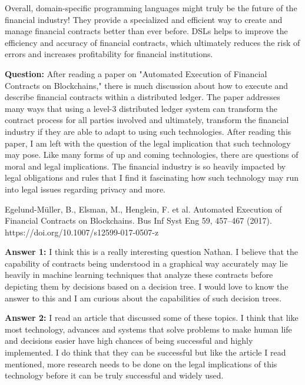 \documentclass{article}
\theoremstyle{theorem}
\theoremstyle{definition}
\theoremstyle{remark}
\begin{document}
Overall, domain-specific programming languages might truly be the future of the financial industry! They provide a specialized and efficient way to create and manage financial contracts better than ever before. DSLs helps to improve the efficiency and accuracy of financial contracts, which ultimately reduces the risk of errors and increases profitability for financial institutions.


\medskip\noindent
\textbf{Question:} After reading a paper on "Automated Execution of Financial Contracts on Blockchains," there is much discussion about how to execute and describe financial contracts within a distributed ledger.  The paper addresses many ways that using a level-3 distributed ledger system can transform the contract process for all parties involved and ultimately, transform the financial industry if they are able to adapt to using such technologies. After reading this paper, I am left with the question of the legal implication that such technology may pose. Like many forms of up and coming technologies, there are questions of moral and legal implications. The financial industry is so heavily impacted by legal obligations and rules that I find it fascinating how such technology may run into legal issues regarding privacy and more.

\medskip\noindent
Egelund-Müller, B., Elsman, M., Henglein, F. et al. Automated Execution of Financial Contracts on Blockchains. Bus Inf Syst Eng 59, 457–467 (2017). https://doi.org/10.1007/s12599-017-0507-z

\medskip\noindent
\textbf{Answer 1:} I think this is a really interesting question Nathan. I believe that the capability of contracts being understood in a graphical way accurately may lie heavily in machine learning techniques that analyze these contracts before depicting them by decisions based on a decision tree. I would love to know the answer to this and I am curious about the capabilities of such decision trees.

\medskip\noindent
\textbf{Answer 2:} I read an article that discussed some of these topics. I think that like most technology, advances and systems that solve problems to make human life and decisions easier have high chances of being successful and highly implemented. I do think that they can be successful but like the article I read mentioned, more research needs to be done on the legal implications of this technology before it can be truly successful and widely used. 

\medskip\noindent
\end{document}
